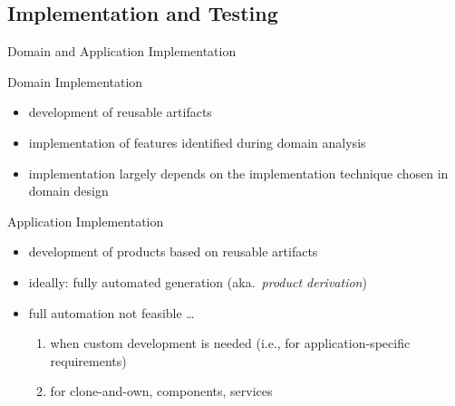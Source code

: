 \subsection{Implementation and Testing}
\begin{frame}{Domain and Application Implementation}
	\begin{fancycolumns}[T,columns=3,widths={10}]
		\renewcommand{\projectcartoonwidth}{1}
	\nextcolumn
		\begin{definition}{Domain Implementation} %
			\begin{itemize}
				\item development of reusable artifacts
				\item implementation of features identified during domain analysis
				\item implementation largely depends on the implementation technique chosen in domain design
			\end{itemize}
		\end{definition}
	\nextcolumn
		\begin{definition}{Application Implementation}
			\begin{itemize}
				\item development of products based on reusable artifacts
				\item ideally: fully automated generation (aka.\ \emph{product derivation})
				\item full automation not feasible \ldots
					\begin{enumerate}
						\item when custom development is needed (i.e., for application-specific requirements)
						\item for clone-and-own, components, services
					\end{enumerate}
			\end{itemize}
		\end{definition}
	\end{fancycolumns}
\end{frame}

